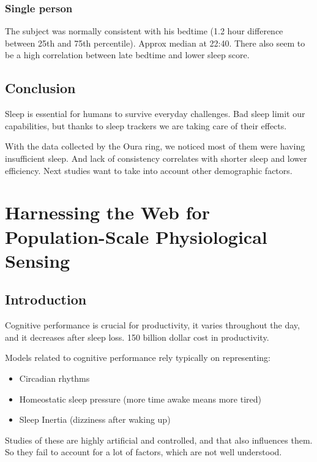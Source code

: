 \documentclass{IEEEtran}
\begin{document}
      \subsubsection{Single person}
        The subject was normally consistent with his bedtime (1.2 hour difference between 25th and 75th percentile). Approx median at 22:40. There also seem to be a high correlation between late bedtime and lower sleep score.
    \subsection{Conclusion}
      Sleep is essential for humans to survive everyday challenges. Bad sleep limit our capabilities, but thanks to sleep trackers we are taking care of their effects. \par 
      With the data collected by the Oura ring, we noticed most of them were having insufficient sleep. And lack of consistency correlates with shorter sleep and lower efficiency. Next studies want to take into account other demographic factors.
  \section{Harnessing the Web for Population-Scale Physiological Sensing}
    \subsection{Introduction}
      Cognitive performance is crucial for productivity, it varies throughout the day, and it decreases after sleep loss. 150 billion dollar cost in productivity. \par 
      Models related to cognitive performance rely typically on representing:
      \begin{itemize}
        \item Circadian rhythms
        \item Homeostatic sleep pressure (more time awake means more tired)
        \item Sleep Inertia (dizziness after waking up)
      \end{itemize}
      \par Studies of these are highly artificial and controlled, and that also influences them. So they fail to account for a lot of factors, which are not well understood. 
\end{document}
